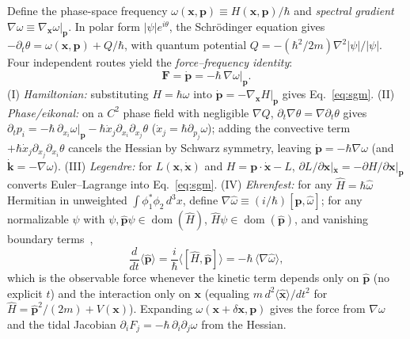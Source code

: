 \documentclass[aps,prl,reprint,superscriptaddress,nofootinbib,floatfix]{revtex4-2}
\theoremstyle{prlthm}
\begin{document}
Define the phase-space frequency $\omega(\mathbf{x},\mathbf{p})\equiv H(\mathbf{x},\mathbf{p})/\hbar$ and \emph{spectral gradient} $\nabla\omega\equiv\nabla_{\mathbf{x}}\omega|_{\mathbf{p}}$. In polar form $|\psi|e^{i\theta}$, the Schr\"odinger equation gives $-\partial_t\theta=\omega(\mathbf{x},\mathbf{p})+Q/\hbar$, with quantum potential $Q=-(\hbar^2/2m)\nabla^2|\psi|/|\psi|$. Four independent routes yield the \emph{force--frequency identity}:
\begin{equation}
  \mathbf{F}=\dot{\mathbf{p}}=-\hbar\,\nabla\omega\big|_{\mathbf{p}}.
  \label{eq:sgm}
\end{equation}
(I) \emph{Hamiltonian:} substituting $H=\hbar\omega$ into $\dot{\mathbf{p}}=-\nabla_{\mathbf{x}}H|_{\mathbf{p}}$ gives Eq.~\eqref{eq:sgm}. (II) \emph{Phase/eikonal:} on a $C^2$ phase field with negligible $\nabla Q$, $\partial_t\nabla\theta=\nabla\partial_t\theta$ gives $\partial_t p_i=-\hbar\,\partial_{x_i}\omega|_{\mathbf{p}}-\hbar\dot{x}_j\partial_{x_i}\partial_{x_j}\theta$ ($\dot{x}_j=\hbar\partial_{p_j}\omega$); adding the convective term $+\hbar\dot{x}_j\partial_{x_j}\partial_{x_i}\theta$ cancels the Hessian by Schwarz symmetry, leaving $\dot{\mathbf{p}}=-\hbar\nabla\omega$ (and $\dot{\mathbf{k}}=-\nabla\omega$). (III) \emph{Legendre:} for $L(\mathbf{x},\dot{\mathbf{x}})$ and $H=\mathbf{p}\cdot\dot{\mathbf{x}}-L$, $\partial L/\partial\mathbf{x}|_{\dot{\mathbf{x}}}=-\partial H/\partial\mathbf{x}|_{\mathbf{p}}$ converts Euler--Lagrange into Eq.~\eqref{eq:sgm}. (IV) \emph{Ehrenfest:} for any $\hat{H}=\hbar\hat{\omega}$ Hermitian in unweighted $\int\phi_1^*\phi_2\,d^3x$, define $\nabla\hat{\omega}\equiv(i/\hbar)[\hat{\mathbf{p}},\hat{\omega}]$; for any normalizable $\psi$ with $\psi,\hat{\mathbf{p}}\psi\in\operatorname{dom}(\hat{H})$, $\hat{H}\psi\in\operatorname{dom}(\hat{\mathbf{p}})$, and vanishing boundary terms~\citep{Ehrenfest1927Bemerkung},
\begin{equation}
  \frac{d}{dt}\langle\hat{\mathbf{p}}\rangle=\frac{i}{\hbar}\langle[\hat{H},\hat{\mathbf{p}}]\rangle=-\hbar\,\langle\nabla\hat{\omega}\rangle,
  \label{eq:sgm_expectation}
\end{equation}
which is the observable force whenever the kinetic term depends only on $\hat{\mathbf{p}}$ (no explicit $t$) and the interaction only on $\mathbf{x}$ (equaling $m\,d^2\langle\hat{\mathbf{x}}\rangle/dt^2$ for $\hat{H}=\hat{\mathbf{p}}^2/(2m)+V(\mathbf{x})$). Expanding $\omega(\mathbf{x}+\delta\mathbf{x},\mathbf{p})$ gives the force from $\nabla\omega$ and the tidal Jacobian $\partial_i F_j=-\hbar\,\partial_i\partial_j\omega$ from the Hessian.
\end{document}
